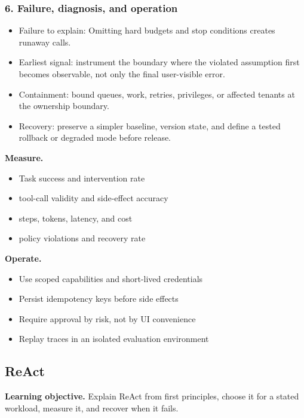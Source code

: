 \subsubsection*{6. Failure, diagnosis, and operation}
\begin{itemize}
\item Failure to explain: Omitting hard budgets and stop conditions creates runaway calls.
\item Earliest signal: instrument the boundary where the violated assumption first becomes observable, not only the final user-visible error.
\item Containment: bound queues, work, retries, privileges, or affected tenants at the ownership boundary.
\item Recovery: preserve a simpler baseline, version state, and define a tested rollback or degraded mode before release.
\end{itemize}
\textbf{Measure.}\begin{itemize}
\item Task success and intervention rate
\item tool-call validity and side-effect accuracy
\item steps, tokens, latency, and cost
\item policy violations and recovery rate
\end{itemize}
\textbf{Operate.}\begin{itemize}
\item Use scoped capabilities and short-lived credentials
\item Persist idempotency keys before side effects
\item Require approval by risk, not by UI convenience
\item Replay traces in an isolated evaluation environment
\end{itemize}
\subsection{ReAct}
\textbf{Learning objective.} Explain ReAct from first principles, choose it for a stated workload, measure it, and recover when it fails.
